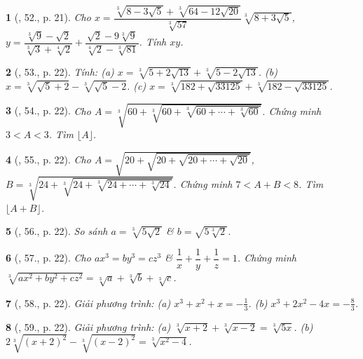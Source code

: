 \documentclass{article}
\newtheorem{baitoan}{}
\begin{document}
\begin{baitoan}[\cite{Tuyen_Toan_9_old}, 52., p. 21]
	Cho $x = \dfrac{\sqrt[3]{8 - 3\sqrt{5}} + \sqrt[3]{64 - 12\sqrt{20}}}{\sqrt[3]{57}}\sqrt[3]{8 + 3\sqrt{5}}$, $y = \dfrac{\sqrt[3]{9} - \sqrt{2}}{\sqrt[3]{3} + \sqrt[4]{2}} + \dfrac{\sqrt{2} - 9\sqrt[3]{9}}{\sqrt[4]{2} - \sqrt[3]{81}}$. Tính $xy$.
\end{baitoan}

\begin{baitoan}[\cite{Tuyen_Toan_9_old}, 53., p. 22]
	Tính: (a) $x = \sqrt[3]{5 + 2\sqrt{13}} + \sqrt[3]{5 - 2\sqrt{13}}$. (b) $x = \sqrt[3]{\sqrt{5} + 2} - \sqrt[3]{\sqrt{5} - 2}$. (c) $x = \sqrt[3]{182 + \sqrt{33125}} + \sqrt[3]{182 - \sqrt{33125}}$.
\end{baitoan}

\begin{baitoan}[\cite{Tuyen_Toan_9_old}, 54., p. 22]
	Cho $A = \sqrt[3]{60 + \sqrt[3]{60 + \sqrt[3]{60 + \cdots + \sqrt[3]{60}}}}$. Chứng minh $3 < A < 3$. Tìm $\lfloor A\rfloor$.
\end{baitoan}

\begin{baitoan}[\cite{Tuyen_Toan_9_old}, 55., p. 22]
	Cho $A = \sqrt{20 + \sqrt{20 + \sqrt{20 + \cdots + \sqrt{20}}}}$, $B = \sqrt[3]{24 + \sqrt[3]{24 + \sqrt[3]{24 + \cdots + \sqrt[3]{24}}}}$. Chứng minh $7 < A + B < 8$. Tìm $\lfloor A + B\rfloor$.
\end{baitoan}

\begin{baitoan}[\cite{Tuyen_Toan_9_old}, 56., p. 22]
	So sánh $a = \sqrt[3]{5\sqrt{2}}$ \& $b = \sqrt{5\sqrt[3]{2}}$.
\end{baitoan}

\begin{baitoan}[\cite{Tuyen_Toan_9_old}, 57., p. 22]
	Cho $ax^3 = by^3 = cz^3$ \& $\dfrac{1}{x} + \dfrac{1}{y} + \dfrac{1}{z} = 1$. Chứng minh $\sqrt[3]{ax^2 + by^2 + cz^2} = \sqrt[3]{a} + \sqrt[3]{b} + \sqrt[3]{c}$.	
\end{baitoan}

\begin{baitoan}[\cite{Tuyen_Toan_9_old}, 58., p. 22]
	Giải phương trình: (a) $x^3 + x^2 + x = -\frac{1}{3}$. (b) $x^3 + 2x^2 - 4x = -\frac{8}{3}$.
\end{baitoan}

\begin{baitoan}[\cite{Tuyen_Toan_9_old}, 59., p. 22]
	Giải phương trình: (a) $\sqrt[3]{x + 2} + \sqrt[3]{x - 2} = \sqrt[3]{5x}$. (b) $2\sqrt[3]{(x + 2)^2} - \sqrt[3]{(x - 2)^2} = \sqrt[3]{x^2 - 4}$.
\end{baitoan}
\end{document}
